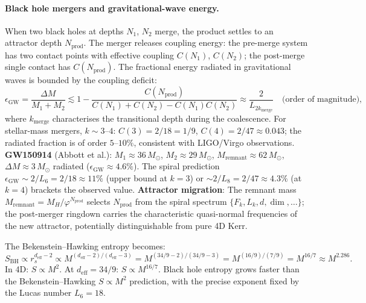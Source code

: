 \documentclass[12pt,a4paper]{article}
\begin{document}
\paragraph{Black hole mergers and gravitational-wave energy.}
When two black holes at depths $N_1$, $N_2$ merge, the product settles to an attractor depth $N_{\mathrm{prod}}$. The merger releases coupling energy: the pre-merge system has two contact points with effective coupling $C(N_1)$, $C(N_2)$; the post-merge single contact has $C(N_{\mathrm{prod}})$. The fractional energy radiated in gravitational waves is bounded by the coupling deficit:
\begin{equation}
\epsilon_{\mathrm{GW}} = \frac{\Delta M}{M_1 + M_2} \lesssim 1 - \frac{C(N_{\mathrm{prod}})}{C(N_1) + C(N_2) - C(N_1)C(N_2)} \approx \frac{2}{L_{2k_{\mathrm{merge}}}} \quad \text{(order of magnitude)},
\end{equation}
where $k_{\mathrm{merge}}$ characterises the transitional depth during the coalescence. For stellar-mass mergers, $k \sim 3$--$4$: $C(3) = 2/18 = 1/9$, $C(4) = 2/47 \approx 0.043$; the radiated fraction is of order $5$--$10\%$, consistent with LIGO/Virgo observations. \textbf{GW150914} (Abbott et al.): $M_1 \approx 36\,M_\odot$, $M_2 \approx 29\,M_\odot$, $M_{\mathrm{remnant}} \approx 62\,M_\odot$, $\Delta M \approx 3\,M_\odot$ radiated ($\epsilon_{\mathrm{GW}} \approx 4.6\%$). The spiral prediction $\epsilon_{\mathrm{GW}} \sim 2/L_6 = 2/18 \approx 11\%$ (upper bound at $k=3$) or $\sim 2/L_8 = 2/47 \approx 4.3\%$ (at $k=4$) brackets the observed value. \textbf{Attractor migration}: The remnant mass $M_{\mathrm{remnant}} = M_H/\varphi^{N_{\mathrm{prod}}}$ selects $N_{\mathrm{prod}}$ from the spiral spectrum $\{F_k, L_k, d, \dim, \ldots\}$; the post-merger ringdown carries the characteristic quasi-normal frequencies of the new attractor, potentially distinguishable from pure 4D Kerr.

The Bekenstein--Hawking entropy becomes:
\begin{equation}
S_{\mathrm{BH}} \propto r_s^{d_{\mathrm{eff}}-2} \propto M^{(d_{\mathrm{eff}}-2)/(d_{\mathrm{eff}}-3)} = M^{(34/9 - 2)/(34/9 - 3)} = M^{(16/9)/(7/9)} = M^{16/7} \approx M^{2.286}.
\end{equation}
In 4D: $S \propto M^2$. At $d_{\mathrm{eff}} = 34/9$: $S \propto M^{16/7}$. Black hole entropy grows faster than the Bekenstein--Hawking $S \propto M^2$ prediction, with the precise exponent fixed by the Lucas number $L_6 = 18$.
\end{document}
